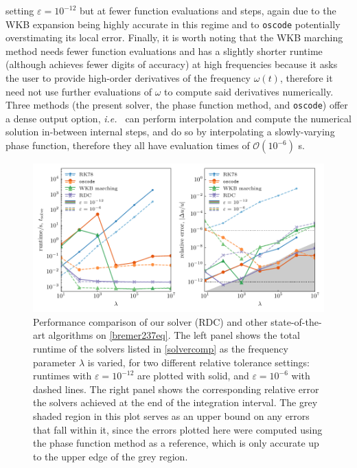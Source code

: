 \documentclass[10pt]{article}
\newcommand{\ie}{{\it i.e.\ }}
\newcommand{\om}{\omega}
\begin{document}
setting $\varepsilon = 10^{-12}$ but at fewer function evaluations and steps,
again due to the WKB expansion being highly accurate in this regime and to
\texttt{oscode} potentially overstimating its local error. Finally, it is worth
noting that the WKB marching method needs fewer function evaluations and has a
slightly shorter runtime (although achieves fewer digits of accuracy) at high
frequencies because it asks the user to provide high-order derivatives of the
frequency $\om(t)$, therefore it need not use further evaluations of $\om$ to
compute said derivatives numerically. Three methods (the present solver, the
phase function method, and \texttt{oscode}) offer a dense output option, \ie
can perform interpolation and compute the numerical solution in-between
internal steps, and do so by interpolating a slowly-varying phase function,
therefore they all have evaluation times of $\mathcal{O}(10^{-6})$ \si{\s}.  

\begin{figure}[tb]
    \centering
    \includegraphics{plots/bremer237-timing.pdf}
    \caption{\label{bremer237-timing} Performance comparison of our solver (RDC) and
    other state-of-the-art algorithms on \cref{bremer237eq}. The left panel
    shows the total runtime of the solvers listed in \cref{solvercomp} as the
    frequency parameter $\lambda$ is varied, for two different relative
    tolerance settings: runtimes with $\varepsilon = 10^{-12}$ are plotted with
    solid, and $\varepsilon = 10^{-6}$ with dashed lines. The right panel shows
    the corresponding relative error the solvers achieved at the end of the
    integration interval. The grey shaded region in this plot serves as an
    upper bound on any errors that fall within it, since the errors plotted
    here were computed using the phase function method as a reference, which is
    only accurate up to the upper edge of the grey region.}
\end{figure}
\end{document}
